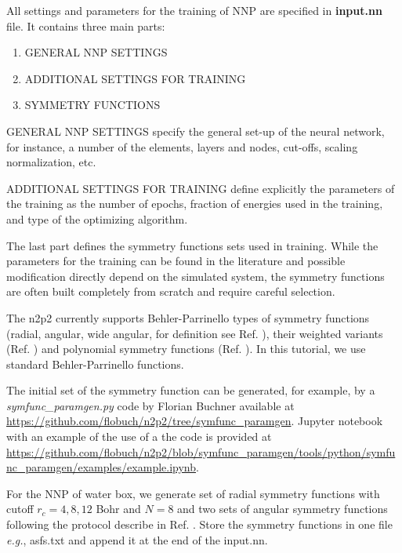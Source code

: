 \documentclass[12pt]{article}
\begin{document}
All settings and parameters for the training of NNP are specified in \textbf{input.nn} file. It contains three main parts:
\begin{enumerate}
    \item GENERAL NNP SETTINGS
    \item ADDITIONAL SETTINGS FOR TRAINING
    \item SYMMETRY FUNCTIONS
\end{enumerate}

GENERAL NNP SETTINGS specify the general set-up of the neural network, for instance, a number of the elements, layers and nodes, cut-offs, scaling normalization, etc.

ADDITIONAL SETTINGS FOR TRAINING define explicitly the parameters of the training as the number of epochs, fraction of energies used in the training, and type of the optimizing algorithm. 

The last part defines the symmetry functions sets used in training. While the parameters for the training can be found in the literature and possible modification directly depend on the simulated system, the symmetry functions are often built completely from scratch and require careful selection.

The n2p2 currently supports Behler-Parrinello types of symmetry functions (radial, angular, wide angular, for definition see Ref. ), their weighted variants (Ref. ) and polynomial symmetry functions (Ref. ). In this tutorial, we use standard Behler-Parrinello functions.

The initial set of the symmetry function can be generated, for example, by a \textit{symfunc\_paramgen.py} code by Florian Buchner available at \url{https://github.com/flobuch/n2p2/tree/symfunc_paramgen}. Jupyter notebook with an example of the use of a the code is provided at \url{https://github.com/flobuch/n2p2/blob/symfunc_paramgen/tools/python/symfunc_paramgen/examples/example.ipynb}.

For the NNP of water box, we generate set of radial symmetry functions with cutoff $r_c = 4, 8, 12$ Bohr and $N = 8$ and two sets of angular symmetry functions following the protocol describe in Ref. .  Store the symmetry functions in one file \textit{e.g.},  asfs.txt and append it at the end of the input.nn.

\begin{center}
\end{center}
\end{document}
